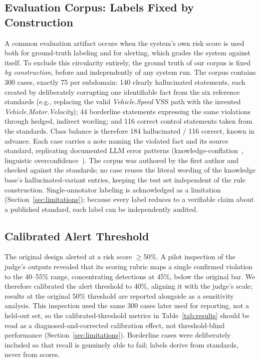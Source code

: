 \documentclass[conference,a4paper]{IEEEtran}
\begin{document}
\subsection{Evaluation Corpus: Labels Fixed by Construction}
A common evaluation artifact occurs when the system's own risk score is used both for ground-truth labeling and for alerting, which grades the system against itself. To exclude this circularity entirely, the ground truth of our corpus is fixed \emph{by construction}, before and independently of any system run. The corpus contains 300 cases, exactly 75 per subdomain: 140 clearly hallucinated statements, each created by deliberately corrupting one identifiable fact from the six reference standards (e.g., replacing the valid \emph{Vehicle.Speed} VSS path with the invented \emph{Vehicle.Motor.Velocity}); 44 borderline statements expressing the same violations through hedged, indirect wording; and 116 correct control statements taken from the standards. Class balance is therefore 184 hallucinated / 116 correct, known in advance. Each case carries a note naming the violated fact and its source standard, replicating documented LLM error patterns (knowledge-conflation~\cite{ref4}, linguistic overconfidence~\cite{ref13}). The corpus was authored by the first author and checked against the standards; no case reuses the literal wording of the knowledge base's hallucinated-variant entries, keeping the test set independent of the rule construction. Single-annotator labeling is acknowledged as a limitation (Section~\ref{sec:limitations}); because every label reduces to a verifiable claim about a published standard, each label can be independently audited.
\subsection{Calibrated Alert Threshold}
The original design alerted at a risk score $\ge$50\%. A pilot inspection of the judge's outputs revealed that its scoring rubric maps a single confirmed violation to the 40--55\% range, concentrating detections at 45\%, below the original bar. We therefore calibrated the alert threshold to 40\%, aligning it with the judge's scale; results at the original 50\% threshold are reported alongside as a sensitivity analysis. This inspection used the same 300 cases later used for reporting, not a held-out set, so the calibrated-threshold metrics in Table~\ref{tab:results} should be read as a diagnosed-and-corrected calibration effect, not threshold-blind performance (Section~\ref{sec:limitations}). Borderline cases were deliberately included so that recall is genuinely able to fail; labels derive from standards, never from scores.
\end{document}
